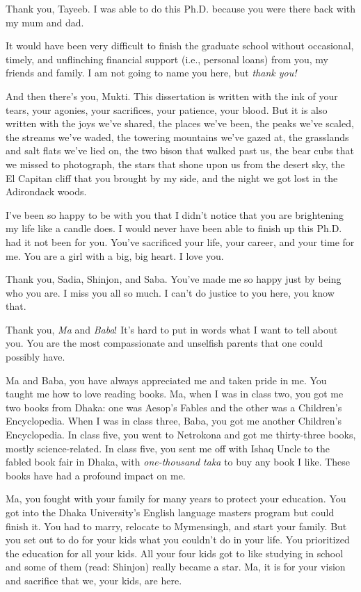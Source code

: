   Thank you, Tayeeb. I was able to do this Ph.D. because you were there back with my mum and dad.


  \AckBreak
  It would have been very difficult to finish the graduate school 
  without occasional, timely, and unflinching financial support 
  (i.e., personal loans) from you, my friends and family. 
  I am not going to name you here, but \emph{thank you!}


  \AckBreak
  And then there's you, Mukti. 
  This dissertation is written with the ink of your tears, 
  your agonies, your sacrifices, your patience, your blood. 
  But it is also written with the joys we've shared, 
  the places we've been, 
  the peaks we've scaled, 
  the streams we've waded, 
  the towering mountains we've gazed at, 
  the grasslands and salt flats we've lied on,
  the two bison that walked past us, 
  the bear cubs that we missed to photograph, 
  the stars that shone upon us from the desert sky, 
  the El Capitan cliff that you brought by my side, 
  and the night we got lost in the Adirondack woods.

I've been so happy to be with you 
  that I didn't notice that you are brightening my life 
  like a candle does. 
  I would never have been able to finish up this Ph.D. had it not been for you. 
  You've sacrificed your life, your career, and your time for me. 
  You are a girl with a big, big heart. 
  I love you.
  

 \AckBreak
 Thank you, Sadia, Shinjon, and Saba. You've made me so happy just by being who you are. 
 I miss you all so much. 
 I can't do justice to you here, you know that.


 Thank you, \emph{Ma} and \emph{Baba}! 
 It's hard to put in words what I want to tell about you. 
 You are the most compassionate and unselfish parents that one could possibly have. 


 Ma and Baba, you have always appreciated me and 
 taken pride in me.  
 You taught me how to love reading books. 
 Ma, when I was in class two, you got me two books from Dhaka: 
 one was Aesop's Fables and the other was a Children's Encyclopedia. 
 When I was in class three, Baba, you got me another Children's Encyclopedia.
 In class five, you went to Netrokona and got me thirty-three books, 
 mostly science-related. 
 In class five, you sent me off with Ishaq Uncle to the fabled book fair in Dhaka, 
 with \emph{one-thousand taka} to buy any book I like. 
 These books have had a profound impact on me. 


 Ma, you fought with your family for many years to 
 protect your education. 
 You got into the Dhaka University's English language masters program 
 but could finish it. 
 You had to marry, relocate to Mymensingh, 
 and start your family. 
 But you set out to do for your kids what you couldn't do in your life. 
 You prioritized the education for all your kids. 
 All your four kids got to like studying in school 
 and some of them (read: Shinjon) really became a star. 
 Ma, it is for your vision and sacrifice that 
 we, your kids, are here.

